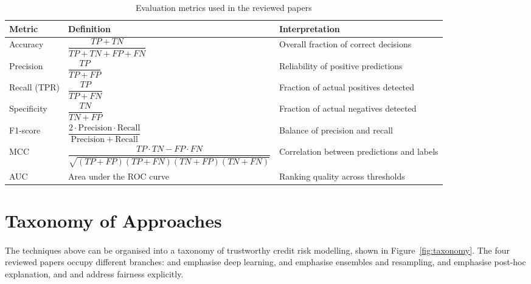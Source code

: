 \documentclass[12pt,a4paper,final]{extreport}
\begin{document}
{\renewcommand{\arraystretch}{1.6}
\begin{table}[htbp]
\centering
\caption{Evaluation metrics used in the reviewed papers}\label{tab:metrics}
\small
\begin{tabularx}{\textwidth}{|p{2.0cm}|p{8.0cm}|X|}
\hline
\textbf{Metric} & \textbf{Definition} & \textbf{Interpretation} \\ \hline
Accuracy & $\dfrac{TP+TN}{TP+TN+FP+FN}$ & Overall fraction of correct decisions \\ \hline
Precision & $\dfrac{TP}{TP+FP}$ & Reliability of positive predictions \\ \hline
Recall (TPR) & $\dfrac{TP}{TP+FN}$ & Fraction of actual positives detected \\ \hline
Specificity & $\dfrac{TN}{TN+FP}$ & Fraction of actual negatives detected \\ \hline
F1-score & $\dfrac{2\cdot\mathrm{Precision}\cdot\mathrm{Recall}}{\mathrm{Precision}+\mathrm{Recall}}$ & Balance of precision and recall \\ \hline
MCC & $\dfrac{TP\cdot TN-FP\cdot FN}{\sqrt{(TP{+}FP)(TP{+}FN)(TN{+}FP)(TN{+}FN)}}$ & Correlation between predictions and labels \\ \hline
AUC & Area under the ROC curve & Ranking quality across thresholds \\ \hline
\end{tabularx}
\end{table}}

\section{Taxonomy of Approaches}

\paragraph{} The techniques above can be organised into a taxonomy of trustworthy credit risk modelling, shown in Figure~\ref{fig:taxonomy}. The four reviewed papers occupy different branches: \cite{p1} and \cite{p2} emphasise deep learning, \cite{p2} and \cite{p3} emphasise ensembles and resampling, \cite{p3} and \cite{p4} emphasise post-hoc explanation, and \cite{p1} and \cite{p4} address fairness explicitly.
\end{document}
